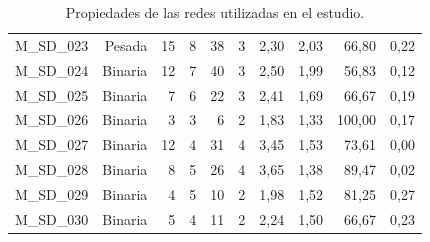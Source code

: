 \begin{table}[ht!]
\begin{tabular}{lrrrrrrrrr}
    M\_SD\_023 & Pesada & 15   & 8    & 38   & 3    & 2,30 & 2,03 & 66,80 & 0,22 \\
    M\_SD\_024 & Binaria & 12   & 7    & 40   & 3    & 2,50 & 1,99 & 56,83 & 0,12 \\
    M\_SD\_025 & Binaria & 7    & 6    & 22   & 3    & 2,41 & 1,69 & 66,67 & 0,19 \\
    M\_SD\_026 & Binaria & 3    & 3    & 6    & 2    & 1,83 & 1,33 & 100,00 & 0,17 \\
    M\_SD\_027 & Binaria & 12   & 4    & 31   & 4    & 3,45 & 1,53 & 73,61 & 0,00 \\
    M\_SD\_028 & Binaria & 8    & 5    & 26   & 4    & 3,65 & 1,38 & 89,47 & 0,02 \\
    M\_SD\_029 & Binaria & 4    & 5    & 10   & 2    & 1,98 & 1,52 & 81,25 & 0,27 \\
    M\_SD\_030 & Binaria & 5    & 4    & 11   & 2    & 2,24 & 1,50 & 66,67 & 0,23 \\
    \bottomrule
    \end{tabular}%
    \caption{\label{table:table_results} Propiedades de las redes utilizadas en el estudio.}
\end{table}%